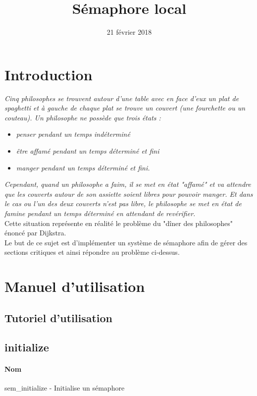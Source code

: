 \documentclass[12pt]{article}
\title{Sémaphore local}
\date{21 février 2018}
\begin{document}
\maketitle
\renewcommand{\contentsname}{Sommaire}
\tableofcontents
\newpage
\section{Introduction}
    \textit{Cinq philosophes se trouvent autour d'une table avec en face d'eux un plat de spaghetti et à gauche de chaque plat se trouve un couvert (une fourchette ou un couteau).
    Un philosophe ne possède que trois états :}
    \begin{itemize}
        \item \textit{penser pendant un temps indéterminé}
        \item \textit{être affamé pendant un temps déterminé et fini}
        \item \textit{manger pendant un temps déterminé et fini.}
    \end{itemize}

    \textit{Cependant, quand un philosophe a faim, il se met en état "affamé" et va attendre que les couverts autour de son assiette soient libres pour pouvoir manger.
    Et dans le cas ou l'un des deux couverts n'est pas libre, le philosophe se met en état de famine pendant un temps déterminé en attendant de revérifier.}\\
    
    Cette situation représente en réalité le problème du "dîner des philosophes" énoncé par Dijkstra. \\
    
    Le but de ce sujet est d'implémenter un système de sémaphore afin de gérer des sections critiques et ainsi répondre au problème ci-dessus.


\newpage
\section{Manuel d'utilisation}
    \subsection{Tutoriel d'utilisation}
    \newpage
    \subsection{initialize}
        \paragraph{Nom\\}
        sem\_initialize - Initialise un sémaphore
\end{document}
